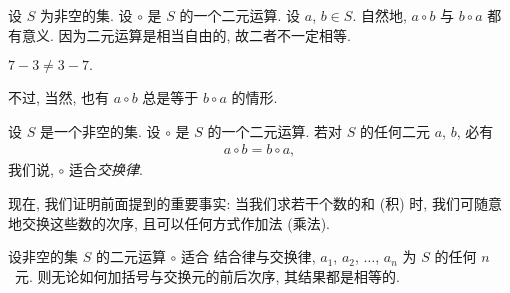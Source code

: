 \vspace{2ex}

设 \(S\) 为非空的集.
设 \(\circ\) 是 \(S\) 的一个二元运算.
设 \(a\), \(b \in S\).
自然地, \(a \circ b\) 与 \(b \circ a\) 都有意义.
因为二元运算是相当自由的,
故二者不一定相等.

\begin{example}
    \(
    7 - 3 \neq 3 - 7.
    \)
\end{example}

不过, 当然, 也有 \(a \circ b\)
总是等于 \(b \circ a\)
的情形.

\begin{definition}
    设 \(S\) 是一个非空的集.
    设 \(\circ\) 是 \(S\) 的一个二元运算.
    若对 \(S\) 的任何二元 \(a\), \(b\),
    必有
    \begin{align*}
        a \circ b = b \circ a,
    \end{align*}
    我们说, \(\circ\) 适合\emph{交换律}.
\end{definition}

现在, 我们证明前面提到的重要事实:
当我们求若干个数的和 (积) 时,
我们可随意地交换这些数的次序,
且可以任何方式作加法 (乘法).

\begin{theorem}
    设非空的集 \(S\) 的二元运算 \(\circ\) 适合%
    结合律与交换律,
    \(a_1\), \(a_2\), \(\dots\), \(a_n\)
    为 \(S\) 的任何 \(n\)~元.
    则无论如何加括号与交换元的前后次序,
    其结果都是相等的.
\end{theorem}

